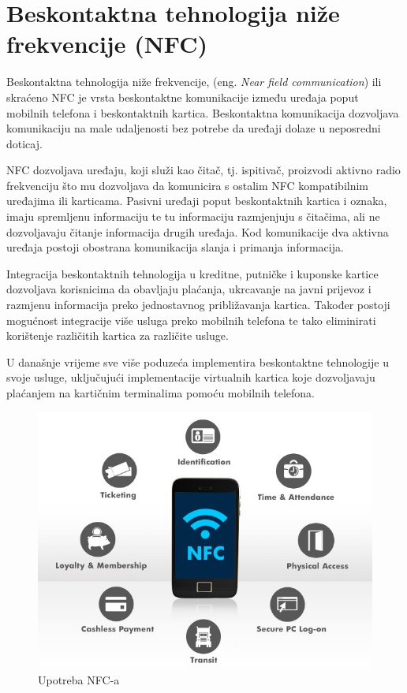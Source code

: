 \documentclass[times, utf8, zavrsni]{fer}
\begin{document}
\chapter{Beskontaktna tehnologija niže frekvencije (\textbf{NFC})}
Beskontaktna tehnologija niže frekvencije, (eng. \textit{Near field communication}) ili skraćeno NFC je vrsta beskontaktne komunikacije između uređaja poput mobilnih telefona i beskontaktnih kartica. Beskontaktna komunikacija dozvoljava komunikaciju na male udaljenosti bez potrebe da uređaji dolaze u neposredni doticaj. \par
NFC dozvoljava uređaju, koji služi kao čitač, tj. ispitivač, proizvodi aktivno radio frekvenciju što mu dozvoljava da komunicira s ostalim NFC kompatibilnim uređajima ili karticama. Pasivni uređaji poput beskontaktnih kartica i oznaka, imaju spremljenu informaciju te tu informaciju razmjenjuju s čitačima, ali ne dozvoljavaju čitanje informacija drugih uređaja. Kod komunikacije dva aktivna uređaja postoji obostrana komunikacija slanja i primanja informacija.\par 
Integracija beskontaktnih tehnologija u kreditne, putničke i kuponske kartice dozvoljava korisnicima da obavljaju plaćanja, ukrcavanje na javni prijevoz i razmjenu informacija preko jednostavnog  približavanja kartica. Također postoji mogućnost integracije više usluga preko mobilnih telefona te tako eliminirati korištenje različitih kartica za različite usluge.\par 
U današnje vrijeme sve više poduzeća implementira beskontaktne tehnologije u svoje usluge, uključujući implementacije virtualnih kartica koje dozvoljavaju plaćanjem na kartičnim terminalima pomoću mobilnih telefona.

\begin{figure}[h]
\includegraphics[scale=0.4]{nfcuse.jpeg}
\centering
\caption{Upotreba NFC-a}
\centering
\end{figure}
\end{document}
